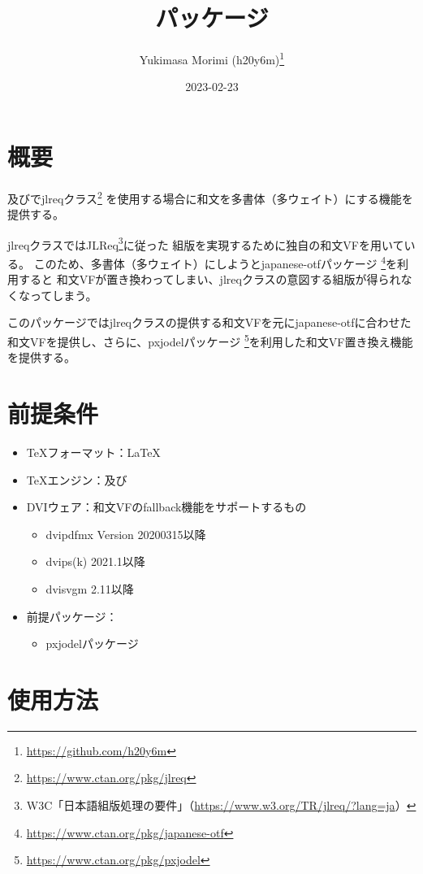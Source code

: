 \documentclass[dvipdfmx,a4paper]{jlreq}
\title{\pkg{jlreq-deluxe}パッケージ}
\author{Yukimasa Morimi (h20y6m)\thanks{\url{https://github.com/h20y6m}}}
\date{2023-02-23}
\newcommand{\pkg}[1]{\textsf{#1}}
\newcommand{\cls}[1]{\textsf{#1}}
\begin{document}
\maketitle


\section{概要}

\pLaTeX 及び\upLaTeX で\cls{jlreq}クラス\footnote{\url{https://www.ctan.org/pkg/jlreq}}%
を使用する場合に和文を多書体（多ウェイト）にする機能を提供する。

\cls{jlreq}クラスではJLReq\footnote{W3C「日本語組版処理の要件」（\url{https://www.w3.org/TR/jlreq/?lang=ja}）}に従った
組版を実現するために独自の和文VFを用いている。
このため、多書体（多ウェイト）にしようと\pkg{japanese-otf}パッケージ
\footnote{\url{https://www.ctan.org/pkg/japanese-otf}}を利用すると
和文VFが置き換わってしまい、\pkg{jlreq}クラスの意図する組版が得られなくなってしまう。

このパッケージでは\cls{jlreq}クラスの提供する和文VFを元に\pkg{japanese-otf}に合わせた
和文VFを提供し、さらに、\pkg{pxjodel}パッケージ
\footnote{\url{https://www.ctan.org/pkg/pxjodel}}を利用した和文VF置き換え機能を提供する。


\section{前提条件}

\begin{itemize}
\item \TeX フォーマット：\LaTeX
\item \TeX エンジン：\pTeX 及び\upTeX
\item DVIウェア：和文VFのfallback機能をサポートするもの
  \begin{itemize}
  \item dvipdfmx Version 20200315以降
  \item dvips(k) 2021.1以降
  \item dvisvgm 2.11以降
  \end{itemize}
\item 前提パッケージ：
  \begin{itemize}
  \item \pkg{pxjodel}パッケージ
  \end{itemize}
\end{itemize}


\section{使用方法}
\end{document}

